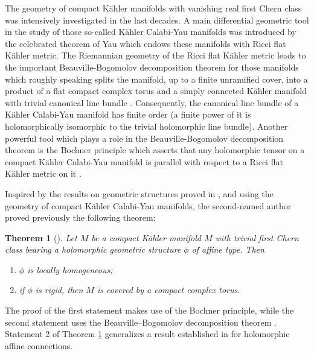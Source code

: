 \documentclass[12pt,reqno]{amsart}
\newtheorem{theorem}{Theorem}[section]
\theoremstyle{definition}
\numberwithin{equation}{section}
\begin{document}
The geometry of compact K\"ahler manifolds with vanishing real first Chern class was intensively 
investigated in the last decades. A main differential geometric tool in the study of those so-called 
K\"ahler Calabi-Yau manifolds was introduced by the celebrated theorem of Yau \cite{Ya} which endows these 
manifolds with Ricci flat K\"ahler metric. The Riemannian geometry of the Ricci flat K\"ahler metric leads 
to the important Beauville-Bogomolov decomposition theorem for those manifolds which roughly speaking 
splits the manifold, up to a finite unramified cover, into a product of a flat compact complex torus and a 
simply connected K\"ahler manifold with trivial canonical line bundle \cite{Be,Bo}. Consequently, the 
canonical line bundle of a K\"ahler Calabi-Yau manifold has finite order (a finite power of it is 
holomorphically isomorphic to the trivial holomorphic line bundle). Another powerful tool which plays a 
role in the Beauville-Bogomolov decomposition theorem is the Bochner principle which asserts that any 
holomorphic tensor on a compact K\"ahler Calabi-Yau manifold is parallel with respect to a Ricci flat 
K\"ahler metric on it \cite{Be}.

Inspired by the results on geometric structures proved in \cite{Gr,DG}, and using the geometry of compact 
K\"ahler Calabi-Yau manifolds, the second-named author proved previously the following theorem:

\begin{theorem}[{\cite{Du}}]\label{thm sorin}
Let $M$ be a compact K\"ahler manifold $M$ with trivial first Chern class bearing a holomorphic geometric
structure $\phi$ of affine type. Then
\begin{enumerate}
\item $\phi$ is locally homogeneous;

\item if $\phi$ is rigid, then $M$ is covered by a compact complex torus. 
\end{enumerate}
\end{theorem}

The proof of the first statement makes use of the Bochner principle, while the second statement uses the 
Beauville--Bogomolov decomposition theorem \cite{Be,Bo}. Statement 2 of Theorem \ref{thm sorin}
generalizes a result established in \cite{IKO} for holomorphic affine connections.
\end{document}
